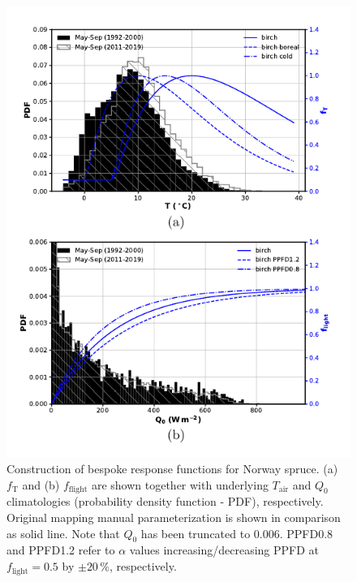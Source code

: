 \documentclass[bg, manuscript]{copernicus}
\begin{document}
\begin{figure}[t]
  \includegraphics[width=12cm]{figB2}
\caption{Construction of bespoke response functions for Norway spruce. (a) $f_\mathrm{T}$ and (b) $f_\mathrm{flight}$ are shown together with underlying $T_\mathrm{air}$ and $Q_0$ climatologies (probability density function - PDF), respectively. Original mapping manual parameterization is shown in comparison as solid line. Note that $Q_0$ has been truncated to $0.006$. PPFD0.8 and PPFD1.2 refer to $\alpha$ values increasing/decreasing PPFD at $f_\mathrm{light}=0.5$ by $\pm 20\,\%$, respectively.}
\label{fig:f_temp_spruce}
\end{figure}
\end{document}
